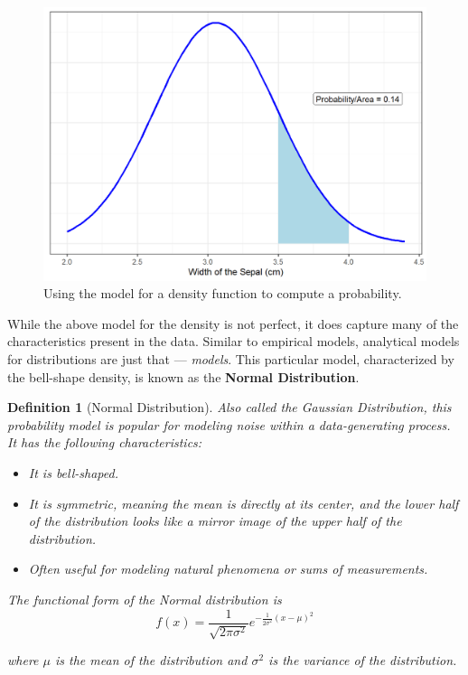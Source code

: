 \documentclass[
]{book}
\providecommand{\tightlist}{%
  \setlength{\itemsep}{0pt}\setlength{\parskip}{0pt}}
\theoremstyle{plain}
\theoremstyle{mydefn}
\newtheorem{definition}{Definition}[chapter]
\theoremstyle{myexmpl}
\theoremstyle{remark}
\begin{document}
\begin{figure}

{\centering \includegraphics[width=0.8\linewidth]{./Images/regconditions-iris-prob-1} 

}

\caption{Using the model for a density function to compute a probability.}\label{fig:regconditions-iris-prob}
\end{figure}

While the above model for the density is not perfect, it does capture many of the characteristics present in the data. Similar to empirical models, analytical models for distributions are just that --- \emph{models}. This particular model, characterized by the bell-shape density, is known as the \textbf{Normal Distribution}.

\begin{definition}[Normal Distribution]
\protect\hypertarget{def:defn-normal-distribution}{}{\label{def:defn-normal-distribution} {} }Also called the Gaussian Distribution, this probability model is popular for modeling noise within a data-generating process. It has the following characteristics:

\begin{itemize}
\tightlist
\item
  It is bell-shaped.
\item
  It is symmetric, meaning the mean is directly at its center, and the lower half of the distribution looks like a mirror image of the upper half of the distribution.
\item
  Often useful for modeling natural phenomena or sums of measurements.
\end{itemize}

The functional form of the Normal distribution is
\[f(x) = \frac{1}{\sqrt{2\pi\sigma^2}} e^{-\frac{1}{2\sigma^2}(x - \mu)^2}\]

where \(\mu\) is the mean of the distribution and \(\sigma^2\) is the variance of the distribution.
\end{definition}
\end{document}
